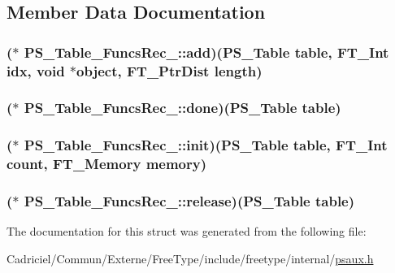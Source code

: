 \subsection{Member Data Documentation}
\hypertarget{struct_p_s___table___funcs_rec___a38a0e111e48a877f52cce490362e4c91}{
\subsubsection[{add}]{($\ast$ P\-S\-\_\-\-Table\-\_\-\-Funcs\-Rec\-\_\-\-::add)({\bf P\-S\-\_\-\-Table} {\bf table}, {\bf F\-T\-\_\-\-Int} idx, {\bf void} $\ast$object, {\bf F\-T\-\_\-\-Ptr\-Dist} {\bf length})}}\label{struct_p_s___table___funcs_rec___a38a0e111e48a877f52cce490362e4c91}
\hypertarget{struct_p_s___table___funcs_rec___a33d660e1444fbe0ef35a87645f5831ad}{
\subsubsection[{done}]{($\ast$ P\-S\-\_\-\-Table\-\_\-\-Funcs\-Rec\-\_\-\-::done)({\bf P\-S\-\_\-\-Table} {\bf table})}}\label{struct_p_s___table___funcs_rec___a33d660e1444fbe0ef35a87645f5831ad}
\hypertarget{struct_p_s___table___funcs_rec___ad0e795ae1e8a7040b7ef80d4a46e8d6a}{
\subsubsection[{init}]{($\ast$ P\-S\-\_\-\-Table\-\_\-\-Funcs\-Rec\-\_\-\-::init)({\bf P\-S\-\_\-\-Table} {\bf table}, {\bf F\-T\-\_\-\-Int} {\bf count}, {\bf F\-T\-\_\-\-Memory} memory)}}\label{struct_p_s___table___funcs_rec___ad0e795ae1e8a7040b7ef80d4a46e8d6a}
\hypertarget{struct_p_s___table___funcs_rec___a252959418225279f78e2ece7fc7705bd}{
\subsubsection[{release}]{($\ast$ P\-S\-\_\-\-Table\-\_\-\-Funcs\-Rec\-\_\-\-::release)({\bf P\-S\-\_\-\-Table} {\bf table})}}\label{struct_p_s___table___funcs_rec___a252959418225279f78e2ece7fc7705bd}


The documentation for this struct was generated from the following file\-:\begin{DoxyCompactItemize}
\item 
Cadriciel/\-Commun/\-Externe/\-Free\-Type/include/freetype/internal/\hyperlink{psaux_8h}{psaux.\-h}\end{DoxyCompactItemize}
